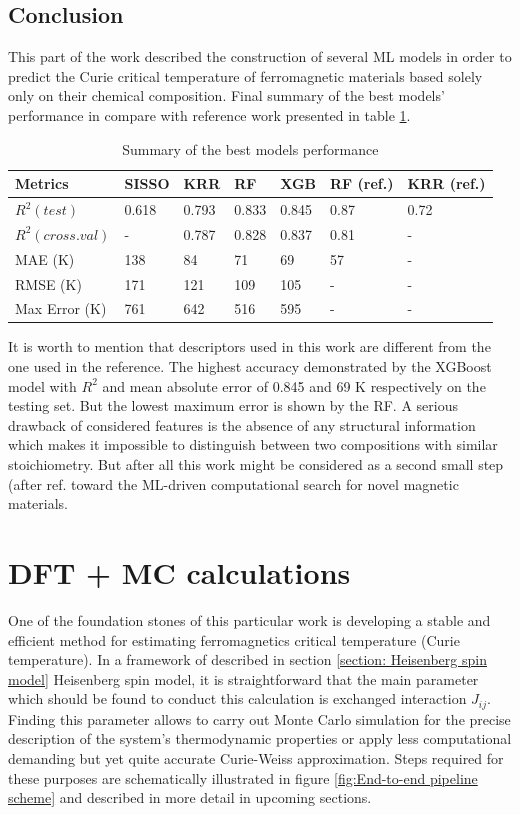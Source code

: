 \subsection{Conclusion}
This part of the work described the construction of several ML models in order to predict the Curie critical temperature of ferromagnetic materials based solely only on their chemical composition. Final summary of the best models’ performance in compare with reference work presented in table \ref{tab:best_models_summary}. 

\begin{table}[H]
\centering
\caption{Summary of the best models performance}
\begin{tabular}{|p{2.5cm}|p{1.6cm}|p{1.6cm}|p{1.6cm}|p{1.6cm}|p{1.6cm}|p{1.8cm}|}
\hline 
Metrics & SISSO & KRR & RF & XGB & RF (ref.) & KRR (ref.) \\ 
\hline 
$R^2 (test)$ & 0.618 & 0.793 & 0.833 & 0.845 & 0.87 & 0.72 \\ 
$R^2 (cross.val)$ & - & 0.787 & 0.828 & 0.837 & 0.81 & - \\ 
MAE (K) & 138 & 84 & 71 & 69 & 57 & - \\ 
RMSE (K) & 171 & 121 & 109 & 105 & - & - \\ 
Max Error (K) & 761 & 642 & 516 & 595 & - & - \\ 
\hline 
\end{tabular} 
\label{tab:best_models_summary}
\end{table}

It is worth to mention that descriptors used in this work are different from the one used in the reference. The highest accuracy demonstrated by the XGBoost model with $R^2$ and mean absolute error of 0.845 and 69 K respectively on the testing set. But the lowest maximum error is shown by the RF.
A serious drawback of considered features is the absence of any structural information which makes it impossible to distinguish between two compositions with similar stoichiometry. But after all this work might be considered as a second small step (after ref.  \cite{Nelson:2019ui} toward the ML-driven computational search for novel magnetic materials.


\cleardoublepage
\section{DFT + MC calculations}

\label{section: DFT_MC}

One of the foundation stones of this particular work is developing a stable and efficient method for estimating ferromagnetics critical temperature (Curie temperature). In a framework of described in section \ref{section: Heisenberg spin model} Heisenberg spin model, it is straightforward that the main parameter which should be found to conduct this calculation is exchanged interaction $J_{ij}$. Finding this parameter allows to carry out Monte Carlo simulation for the precise description of the system's thermodynamic properties or apply less computational demanding but yet quite accurate Curie-Weiss approximation.  Steps required for these purposes are schematically illustrated in figure \ref{fig:End-to-end pipeline scheme} and described in more detail in upcoming sections.


